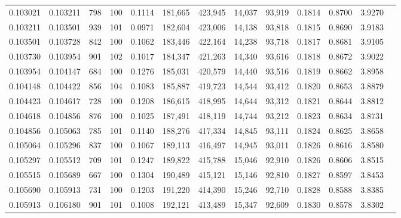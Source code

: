 \begin{tabular}{rrrrrrrrrrrrr}
0.103021 & 0.103211 &   798 & 100 &                                     0.1114 & 181,665 & 423,945 &  14,037 &  93,919 & 0.1814 & 0.8700 & 3.9270 \\
0.103211 & 0.103501 &   939 & 101 &                                     0.0971 & 182,604 & 423,006 &  14,138 &  93,818 & 0.1815 & 0.8690 & 3.9183 \\
0.103501 & 0.103728 &   842 & 100 &                                     0.1062 & 183,446 & 422,164 &  14,238 &  93,718 & 0.1817 & 0.8681 & 3.9105 \\
0.103730 & 0.103954 &   901 & 102 &                                     0.1017 & 184,347 & 421,263 &  14,340 &  93,616 & 0.1818 & 0.8672 & 3.9022 \\
0.103954 & 0.104147 &   684 & 100 &                                     0.1276 & 185,031 & 420,579 &  14,440 &  93,516 & 0.1819 & 0.8662 & 3.8958 \\
0.104148 & 0.104422 &   856 & 104 &                                     0.1083 & 185,887 & 419,723 &  14,544 &  93,412 & 0.1820 & 0.8653 & 3.8879 \\
0.104423 & 0.104617 &   728 & 100 &                                     0.1208 & 186,615 & 418,995 &  14,644 &  93,312 & 0.1821 & 0.8644 & 3.8812 \\
0.104618 & 0.104856 &   876 & 100 &                                     0.1025 & 187,491 & 418,119 &  14,744 &  93,212 & 0.1823 & 0.8634 & 3.8731 \\
0.104856 & 0.105063 &   785 & 101 &                                     0.1140 & 188,276 & 417,334 &  14,845 &  93,111 & 0.1824 & 0.8625 & 3.8658 \\
0.105064 & 0.105296 &   837 & 100 &                                     0.1067 & 189,113 & 416,497 &  14,945 &  93,011 & 0.1826 & 0.8616 & 3.8580 \\
0.105297 & 0.105512 &   709 & 101 &                                     0.1247 & 189,822 & 415,788 &  15,046 &  92,910 & 0.1826 & 0.8606 & 3.8515 \\
0.105515 & 0.105689 &   667 & 100 &                                     0.1304 & 190,489 & 415,121 &  15,146 &  92,810 & 0.1827 & 0.8597 & 3.8453 \\
0.105690 & 0.105913 &   731 & 100 &                                     0.1203 & 191,220 & 414,390 &  15,246 &  92,710 & 0.1828 & 0.8588 & 3.8385 \\
0.105913 & 0.106180 &   901 & 101 &                                     0.1008 & 192,121 & 413,489 &  15,347 &  92,609 & 0.1830 & 0.8578 & 3.8302 \\

\end{tabular}

